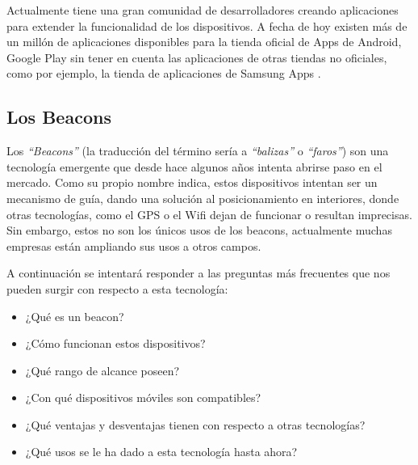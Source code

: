 Actualmente tiene una gran comunidad de desarrolladores creando aplicaciones para extender la funcionalidad de los dispositivos. A fecha de hoy existen más de un millón de aplicaciones disponibles para la tienda oficial de Apps de Android, Google Play \cite{URL::GooglePlay} sin tener en cuenta las aplicaciones de otras tiendas no oficiales, como por ejemplo, la tienda de aplicaciones de Samsung Apps \cite{URL::SamsungApps}.

\subsection{Los Beacons}

Los \textit{``Beacons''} \cite{URL::Beacon} (la traducción del término sería a \textit{``balizas''} o \textit{``faros''}) son una tecnología emergente que desde hace algunos años intenta abrirse paso en el mercado. Como su propio nombre indica, estos dispositivos intentan ser un mecanismo de guía, dando una solución al posicionamiento en interiores, donde otras tecnologías, como el GPS \cite{URL::GPS} o el Wifi dejan de funcionar o resultan imprecisas. Sin embargo, estos no son los únicos usos de los beacons, actualmente muchas empresas están ampliando sus usos a otros campos.


A continuación se intentará responder a las preguntas más frecuentes que nos pueden surgir con respecto a esta tecnología:


\begin{itemize}
\item ¿Qué es un beacon?
\item ¿Cómo funcionan estos dispositivos?
\item ¿Qué rango de alcance poseen?
\item ¿Con qué dispositivos móviles son compatibles? 
\item ¿Qué ventajas y desventajas tienen con respecto a otras tecnologías?
\item ¿Qué usos se le ha dado a esta tecnología hasta ahora?
\end{itemize}

\begin{figure}[!h]
        \begin{floatrow}
        \end{floatrow}
\end{figure}

